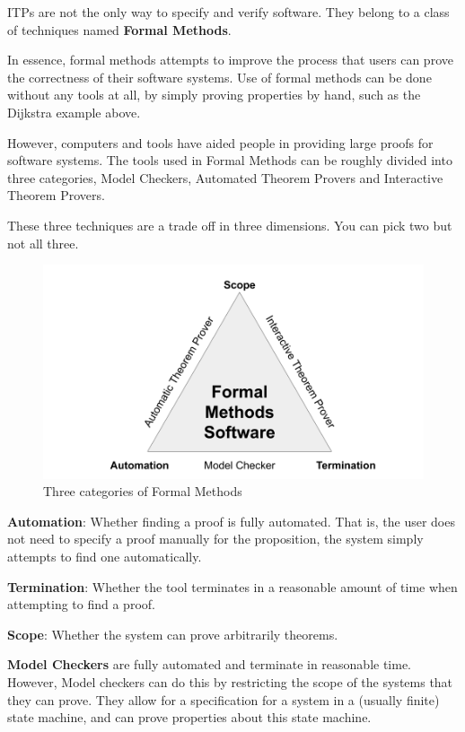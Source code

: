 \documentclass[
]{article}
\begin{document}
ITPs are not the only way to specify and verify software. They belong to
a class of techniques named \textbf{Formal Methods}.

In essence, formal methods attempts to improve the process that users
can prove the correctness of their software systems. Use of formal
methods can be done without any tools at all, by simply proving
properties by hand, such as the Dijkstra example above.

However, computers and tools have aided people in providing large proofs
for software systems. The tools used in Formal Methods can be roughly
divided into three categories, Model Checkers, Automated Theorem Provers
and Interactive Theorem Provers.

These three techniques are a trade off in three dimensions. You can pick
two but not all three.

\begin{figure}
\hypertarget{fig:formal_methods}{%
\centering
\includegraphics{./Images/formalmethods.png}
\caption{Three categories of Formal Methods}\label{fig:formal_methods}
}
\end{figure}

\textbf{Automation}: Whether finding a proof is fully automated. That
is, the user does not need to specify a proof manually for the
proposition, the system simply attempts to find one automatically.

\textbf{Termination}: Whether the tool terminates in a reasonable amount
of time when attempting to find a proof.

\textbf{Scope}: Whether the system can prove arbitrarily theorems.

\textbf{Model Checkers} are fully automated and terminate in reasonable
time. However, Model checkers can do this by restricting the scope of
the systems that they can prove. They allow for a specification for a
system in a (usually finite) state machine, and can prove properties
about this state machine.
\end{document}
